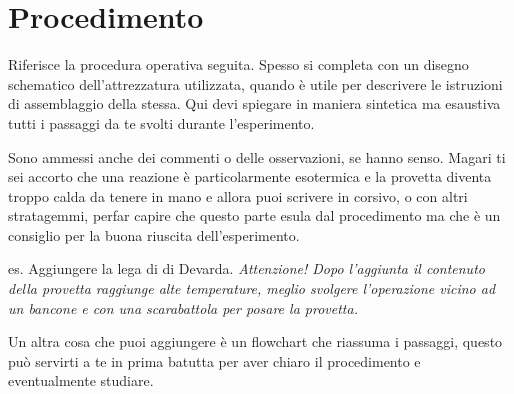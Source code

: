 \section{Procedimento}
Riferisce la procedura  operativa seguita. Spesso si completa con un disegno schematico dell'attrezzatura utilizzata, quando è utile per descrivere le istruzioni di assemblaggio della stessa. Qui devi spiegare in maniera sintetica ma esaustiva tutti i passaggi da te svolti durante l'esperimento.

Sono ammessi anche dei commenti o delle osservazioni, se hanno senso. Magari ti sei accorto che una reazione è particolarmente esotermica e la provetta diventa troppo calda da tenere in mano e allora puoi scrivere in corsivo, o con altri stratagemmi, perfar capire che questo parte esula dal procedimento ma che è un consiglio per la buona riuscita dell'esperimento.

es.
Aggiungere la lega di di Devarda. 
\textit{Attenzione! Dopo l'aggiunta il contenuto della provetta raggiunge alte temperature, meglio svolgere l'operazione vicino ad un bancone e con una scarabattola per posare la provetta.}


Un altra cosa che puoi aggiungere è un flowchart che riassuma i passaggi, questo può servirti a te in prima batutta per aver chiaro il procedimento e eventualmente studiare.
\begin{center}
    \vspace{0.5cm}
\end{center}
